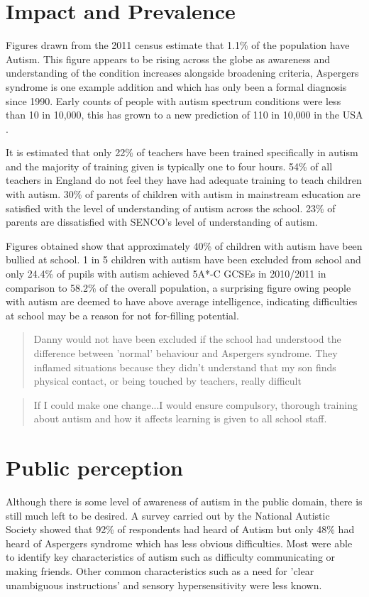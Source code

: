 \documentclass[11pt]{report}
\begin{document}
\section{Impact and Prevalence}
Figures drawn from the 2011 census estimate that 1.1\% of the population have Autism\cite{nas}. This figure appears to be rising across the globe as awareness and understanding of the condition increases alongside broadening criteria\cite{increasingprevalence}, Aspergers syndrome is one example addition and which has only been a formal diagnosis since 1990. Early counts of people with autism spectrum conditions were less than 10 in 10,000, this has grown to a new prediction of 110 in 10,000 in the USA \cite{increasingprevalence}.

It is estimated that only 22\% of teachers have been trained specifically in autism and the majority of training given is typically one to four hours. 54\% of all teachers in England do not feel they have had adequate training to teach children with autism.\cite{statsandfacts} 30\% of parents of children with autism in mainstream education are satisfied with the level of understanding of autism across the school\cite{nasschool}. 23\% of parents are dissatisfied with SENCO's level of understanding of autism. 

Figures obtained show that approximately 40\% of children with autism have been bullied at school. 1 in 5 children with autism have been excluded from school \cite{nasschool} and only 24.4\% of pupils with autism achieved 5A*-C GCSEs in 2010/2011 in comparison to 58.2\% of the overall population\cite{statsandfacts}, a surprising figure owing people with autism are deemed to have above average intelligence, indicating difficulties at school may be a reason for not for-filling potential. 

\begin{quote}
Danny would not have been excluded if the school had understood the difference between 'normal' behaviour and Aspergers syndrome. They inflamed situations because they didn't understand that my son finds physical contact, or being touched by teachers, really difficult \cite{nasschool}
\end{quote}

\begin{quote}
If I could make one change...I would ensure compulsory, thorough training about autism and how it affects learning is given to all school staff. \cite{nasschool}
\end{quote}

\section{Public perception}
Although there is some level of awareness of autism in the public domain, there is still much left to be desired.  A survey carried out by the National Autistic Society showed that 92\% of respondents had heard of Autism but only 48\% had heard of Aspergers syndrome which has less obvious difficulties. Most were able to identify key characteristics of autism such as difficulty communicating or making friends. Other common characteristics such as a need for 'clear unambiguous instructions' and sensory hypersensitivity were less known\cite{autismmisconception}. 
\end{document}
